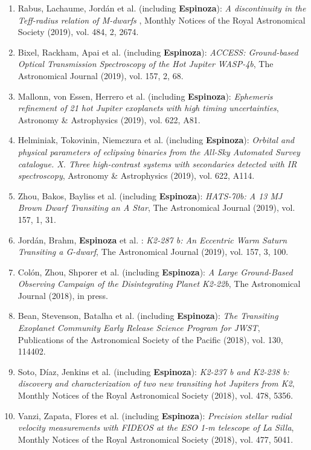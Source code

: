 \documentclass[12pt, a4paper]{article} %
\begin{document}
\begin{flushleft}
\begin{enumerate}
\item Rabus, Lachaume, Jord\'an et al. (including \textbf{Espinoza}): \textit{A discontinuity in the Teff-radius relation of M-dwarfs
}, Monthly Notices of the Royal Astronomical Society (2019), vol. 484, 2, 2674.
\item Bixel, Rackham, Apai et al. (including \textbf{Espinoza}): \textit{ACCESS: Ground-based Optical Transmission Spectroscopy of the Hot Jupiter WASP-4b}, The Astronomical Journal (2019), vol. 157, 2, 68.
\item Mallonn, von Essen, Herrero et al. (including \textbf{Espinoza}): \textit{Ephemeris refinement of 21 hot Jupiter exoplanets with high timing uncertainties}, Astronomy \& Astrophysics (2019), vol. 622, A81.
\item Helminiak, Tokovinin, Niemczura et al. (including \textbf{Espinoza}): \textit{Orbital and physical parameters of eclipsing binaries from the All-Sky Automated Survey catalogue. X. Three high-contrast systems with secondaries detected with IR spectroscopy}, Astronomy \& Astrophysics (2019), vol. 622, A114.
\item Zhou, Bakos, Bayliss et al. (including \textbf{Espinoza}): \textit{HATS-70b: A 13 MJ Brown Dwarf Transiting an A Star}, The Astronomical Journal (2019), vol. 157, 1, 31.
\item Jord\'an, Brahm, \textbf{Espinoza} et al. : \textit{K2-287 b: An Eccentric Warm Saturn Transiting a G-dwarf}, The Astronomical Journal (2019), vol. 157, 3, 100.
\item Col\'on, Zhou, Shporer et al. (including \textbf{Espinoza}): \textit{A Large Ground-Based Observing Campaign of the Disintegrating Planet K2-22b}, The Astronomical Journal (2018), in press.
\item Bean, Stevenson, Batalha et al. (including \textbf{Espinoza}): \textit{The Transiting Exoplanet Community Early Release Science Program for JWST}, Publications of the Astronomical Society of the Pacific (2018), vol. 130, 114402.
\item Soto, D\'iaz, Jenkins et al. (including \textbf{Espinoza}): \textit{K2-237 b and K2-238 b: discovery and characterization of two new transiting hot Jupiters from K2},  Monthly Notices of the Royal Astronomical Society (2018), vol. 478, 5356.
\item Vanzi, Zapata, Flores et al. (including \textbf{Espinoza}): \textit{Precision stellar radial velocity measurements with FIDEOS at the ESO 1-m telescope of La Silla},  Monthly Notices of the Royal Astronomical Society (2018), vol. 477, 5041.

\end{enumerate}
\end{flushleft}
\end{document}
